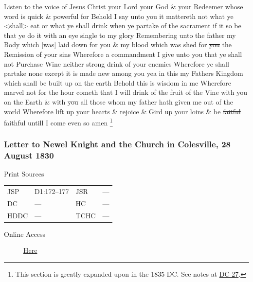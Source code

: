 				Listen to the voice of Jesus Christ your Lord your God \& your Redeemer whose word is quick \& powerful for Behold I say unto you it mattereth not what ye <shall> eat or what ye shall drink when ye partake of the sacrament if it so be that ye do it with an eye single to my glory Remembering unto the father my Body which [was] laid down for you \& my blood which was shed for \sout{you} the Remission of your sins Wherefore a commandment I give unto you that ye shall not Purchase Wine neither strong drink of your enemies Wherefore ye shall partake none except it is made new among you yea in this my Fathers Kingdom which shall be built up on the earth Behold this is wisdom in me Wherefore marvel not for the hour cometh that I will drink of the fruit of the Vine with you on the Earth \& with \sout{you} all those whom my father hath given me out of the world Wherefore lift up your hearts \& rejoice \& Gird up your loins \& be \sout{faitful} faithful untill I come even so amen%
					\footnote{%
						\label{EMS-1830-JS-CIR-AUG-1830-NOTE-expansion}%
						This section is greatly expanded upon in the 1835 DC. See notes at \hyperref[DC27]{DC 27}.
						}
				
		\subsubsection{Letter to Newel Knight and the Church in Colesville, 28 August 1830}
			\label{EMS-1830-JS-28-AUG-1830}
		
			\begin{description}
				\item[Print Sources]
			\end{description}

				\begin{tabular}{p{0.5in}p{1in}p{0.5in}p{1in}}
				JSP	 	& D1:172--177	& JSR 		& --- \\
				DC	 	& ---			& HC 		& --- \\
				HDDC 	& ---			& TCHC 		& --- \\
				\end{tabular}
			
			\begin{description}
				\item[Online Access] \href{https://www.josephsmithpapers.org/paper-summary/letter-to-newel-knight-and-the-church-in-colesville-28-august-1830/1}{Here}
			\end{description}
			
